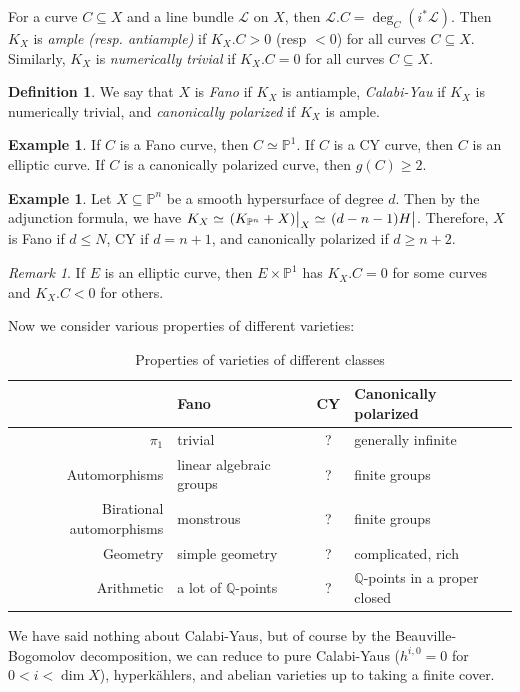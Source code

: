 \documentclass[leqno, openany]{memoir}
\theoremstyle{definition}
\newtheorem{defn}[thm]{Definition}
\newtheorem{exm}[thm]{Example}
\theoremstyle{remark}
\newtheorem{rmk}[thm]{Remark}
\theoremstyle{plain}
\theoremstyle{definition}
\theoremstyle{remark}
\newcommand{\Q}{\mathbb{Q}}
\renewcommand{\P}{\mathbb{P}}
\newcommand{\mc}[1]{\mathcal{#1}}
\begin{document}
For a curve $C \subseteq X$ and a line bundle $\mc{L}$ on $X$, then $\mc{L}.C = \deg_C(i^* \mc{L})$. Then $K_X$ is \textit{ample (resp. antiample)} if $K_X . C > 0$ (resp $<0$) for all curves $C \subseteq X$. Similarly, $K_X$ is \textit{numerically trivial} if $K_X . C = 0$ for all curves $C \subseteq X$.

\begin{defn}
    We say that $X$ is \textit{Fano} if $K_X$ is antiample, \textit{Calabi-Yau} if $K_X$ is numerically trivial, and \textit{canonically polarized} if $K_X$ is ample.
\end{defn}

\begin{exm}
    If $C$ is a Fano curve, then $C \simeq \P^1$. If $C$ is a CY curve, then $C$ is an elliptic curve. If $C$ is a canonically polarized curve, then $g(C) \geq 2$.
\end{exm}

\begin{exm}
    Let $X \subseteq \P^n$ be a smooth hypersurface of degree $d$. Then by the adjunction formula, we have $K_X \simeq \eval{(K_{\P^n} + X)}_X \simeq \eval{(d-n-1)H}$. Therefore, $X$ is Fano if $d \leq N$, CY if $d = n+1$, and canonically polarized if $d \geq n+2$.
\end{exm}

\begin{rmk}
    If $E$ is an elliptic curve, then $E \times \P^1$ has $K_X . C = 0$ for some curves and $K_X . C < 0$ for others.
\end{rmk}

Now we consider various properties of different varieties:
\begin{table}[H]
    \centering
    \caption{Properties of varieties of different classes}
    \label{tab:label}
    \begin{tabular}{rlcl}
    \toprule
    & Fano & CY & Canonically polarized \\
    \midrule
        $\pi_1$ & trivial & {?} & generally infinite \\
        Automorphisms & linear algebraic groups & {?} & finite groups \\
        Birational automorphisms & monstrous & {?} & finite groups \\
        Geometry & simple geometry & {?} & complicated, rich \\
        Arithmetic & a lot of $\Q$-points & {?} & $\Q$-points in a proper closed \\
        \bottomrule
    \end{tabular}
\end{table}
We have said nothing about Calabi-Yaus, but of course by the Beauville-Bogomolov decomposition, we can reduce to pure Calabi-Yaus ($h^{i,0} = 0$ for $0 < i < \dim X$), hyperk\"ahlers, and abelian varieties up to taking a finite cover.
\end{document}
